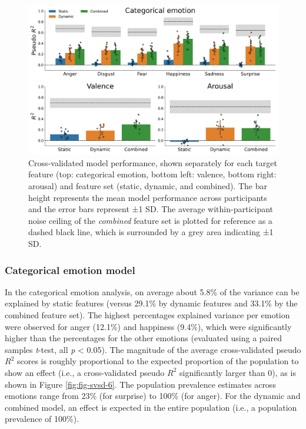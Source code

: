 \documentclass[12pt,american,a4paper,oneside,]{memoir} %
\begin{document}
\begin{figure}
\centering
\includegraphics{_bookdown_files/static-vs-dynamic-files/figures/figure_5.pdf}
\caption{\label{fig:fig-svsd-5}Cross-validated model performance, shown separately for each target feature (top: categorical emotion, bottom left: valence, bottom right: arousal) and feature set (static, dynamic, and combined). The bar height represents the mean model performance across participants and the error bars represent ±1 SD. The average within-participant noise ceiling of the \emph{combined} feature set is plotted for reference as a dashed black line, which is surrounded by a grey area indicating ±1 SD.}
\end{figure}



\hypertarget{categorical-emotion-model}{%
\subsubsection{Categorical emotion model}\label{categorical-emotion-model}}

In the categorical emotion analysis, on average about 5.8\% of the variance can be explained by static features (versus 29.1\% by dynamic features and 33.1\% by the combined feature set). The highest percentages explained variance per emotion were observed for anger (12.1\%) and happiness (9.4\%), which were significantly higher than the percentages for the other emotions (evaluated using a paired samples \emph{t}-test, all \emph{p} \textless{} 0.05). The magnitude of the average cross-validated pseudo \(R^2\) scores is roughly proportional to the expected proportion of the population to show an effect (i.e., a cross-validated pseudo \(R^{2}\) significantly larger than 0), as is shown in Figure \ref{fig:fig-svsd-6}. The population prevalence estimates across emotions range from 23\% (for surprise) to 100\% (for anger). For the dynamic and combined model, an effect is expected in the entire population (i.e., a population prevalence of 100\%).
\end{document}
